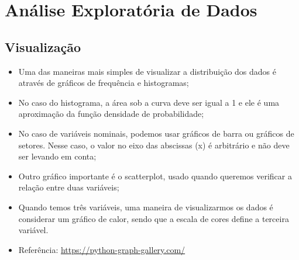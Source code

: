 \documentclass{article}
\begin{document}
\section{Análise Exploratória de Dados}
\subsection{Visualização}
\begin{itemize}
    \item Uma das maneiras mais simples de visualizar a distribuição dos dados é através de gráficos de frequência e histogramas;
    \item No caso do histograma, a área sob a curva deve ser igual a 1 e ele é uma aproximação da função densidade de probabilidade;
    \item No caso de variáveis nominais, podemos usar gráficos de barra ou gráficos de setores. Nesse caso, o valor no eixo das abscissas (x) é arbitrário e não deve ser levando em conta;
    \item Outro gráfico importante é o scatterplot, usado quando queremos verificar a relação entre duas variáveis;
    \item Quando temos três variáveis, uma maneira de visualizarmos os dados é considerar um gráfico de calor, sendo que a escala de cores define a terceira variável.
    \item Referência: \url{https://python-graph-gallery.com/}
\end{itemize}
\end{document}
